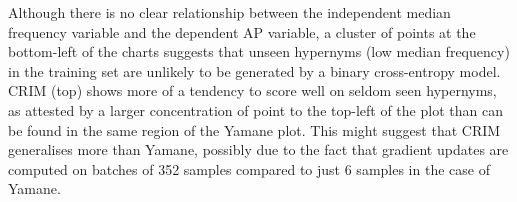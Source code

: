 Although there is no clear relationship between the independent median frequency variable and the dependent \ac{AP} variable, a cluster of points at the bottom-left of the charts suggests that unseen hypernyms (low median frequency) in the training set are unlikely to be generated by a binary cross-entropy model.  CRIM (top) shows more of a tendency to score well on seldom seen hypernyms, as attested by a larger concentration of point to the top-left of the plot than can be found in the same region of the Yamane plot.  This might suggest that CRIM generalises more than Yamane, possibly due to the fact that gradient updates are computed on batches of 352 samples compared to just 6 samples in the case of Yamane.

